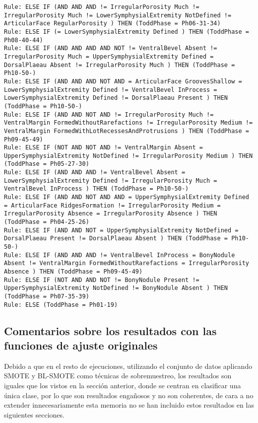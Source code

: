 \begin{lstlisting}
Rule: ELSE IF (AND AND AND != IrregularPorosity Much != IrregularPorosity Much != LowerSymphysialExtremity NotDefined != ArticularFace RegularPorosity ) THEN (ToddPhase = Ph06-31-34)
Rule: ELSE IF (= LowerSymphysialExtremity Defined ) THEN (ToddPhase = Ph08-40-44)
Rule: ELSE IF (AND AND AND AND NOT != VentralBevel Absent != IrregularPorosity Much = UpperSymphysialExtremity Defined = DorsalPlaeau Absent != IrregularPorosity Much ) THEN (ToddPhase = Ph10-50-)
Rule: ELSE IF (AND AND AND NOT AND = ArticularFace GroovesShallow = LowerSymphysialExtremity Defined != VentralBevel InProcess = LowerSymphysialExtremity Defined != DorsalPlaeau Present ) THEN (ToddPhase = Ph10-50-)
Rule: ELSE IF (AND AND NOT AND != IrregularPorosity Much != VentralMargin FormedWithoutRarefactions != IrregularPorosity Medium != VentralMargin FormedWithLotRecessesAndProtrusions ) THEN (ToddPhase = Ph09-45-49)
Rule: ELSE IF (NOT AND NOT AND != VentralMargin Absent = UpperSymphysialExtremity NotDefined != IrregularPorosity Medium ) THEN (ToddPhase = Ph05-27-30)
Rule: ELSE IF (AND AND AND != VentralBevel Absent = LowerSymphysialExtremity Defined != IrregularPorosity Much = VentralBevel InProcess ) THEN (ToddPhase = Ph10-50-)
Rule: ELSE IF (AND AND NOT AND AND = UpperSymphysialExtremity Defined = ArticularFace RidgesFormation != IrregularPorosity Medium = IrregularPorosity Absence = IrregularPorosity Absence ) THEN (ToddPhase = Ph04-25-26)
Rule: ELSE IF (AND AND NOT = UpperSymphysialExtremity NotDefined = DorsalPlaeau Present != DorsalPlaeau Absent ) THEN (ToddPhase = Ph10-50-)
Rule: ELSE IF (AND AND AND != VentralBevel InProcess = BonyNodule Absent != VentralMargin FormedWithoutRarefactions = IrregularPorosity Absence ) THEN (ToddPhase = Ph09-45-49)
Rule: ELSE IF (NOT AND AND NOT != BonyNodule Present != UpperSymphysialExtremity NotDefined != BonyNodule Absent ) THEN (ToddPhase = Ph07-35-39)
Rule: ELSE (ToddPhase = Ph01-19)
\end{lstlisting}

\newpage

\subsection{Comentarios sobre los resultados con las funciones de ajuste originales}

Debido a que en el resto de ejecuciones, utilizando el conjunto de datos aplicando SMOTE y BL-SMOTE como técnicas de sobremuestreo, los resultados son iguales que los vistos en la sección anterior, donde se centran en clasificar una única clase, por lo que son resultados engañosos y no son coherentes, de cara a no extender innecesariamente esta memoria no se han incluido estos resultados en las siguientes secciones.



